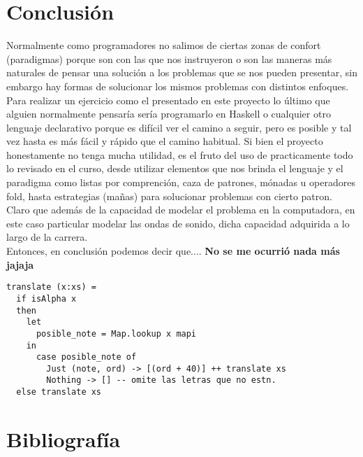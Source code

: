 \documentclass[10pt,a4paper]{article}
\begin{document}
\section{Conclusión}
\noindent Normalmente como programadores no salimos de ciertas zonas de confort (paradigmas) porque son con las que nos instruyeron o son las maneras más naturales de pensar una solución a los problemas que se nos pueden presentar, sin embargo hay formas de solucionar los mismos problemas con distintos enfoques. Para realizar un ejercicio como el presentado en este proyecto lo último que alguien normalmente pensaría sería programarlo en Haskell o cualquier otro lenguaje declarativo porque es difícil ver el camino a seguir, pero es posible y tal vez hasta es más fácil y rápido que el camino habitual. Si bien el proyecto honestamente no tenga mucha utilidad, es el fruto del uso de practicamente todo lo revisado en el curso, desde utilizar elementos que nos brinda el lenguaje y el paradigma como listas por comprención, caza de patrones, mónadas u operadores fold, hasta estrategias (mañas) para solucionar problemas con cierto patron. Claro que además de la capacidad de modelar el problema en la computadora, en este caso particular modelar las ondas de sonido, dicha capacidad adquirida a lo largo de la carrera.\\
Entonces, en conclusión podemos decir que.... \textbf{No se me ocurrió nada más jajaja}

\begin{verbatim}
translate (x:xs) =
  if isAlpha x
  then
    let
      posible_note = Map.lookup x mapi
    in
      case posible_note of
        Just (note, ord) -> [(ord + 40)] ++ translate xs
        Nothing -> [] -- omite las letras que no estn.
  else translate xs
\end{verbatim}

\section{Bibliografía}
\end{document}
